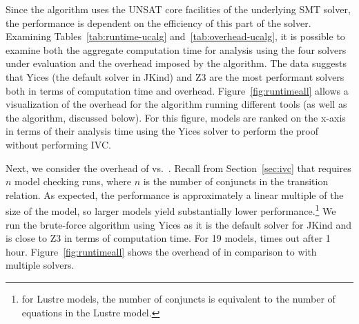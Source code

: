 Since the \ucalg algorithm uses the UNSAT core facilities of the
underlying SMT solver, the performance is dependent on the efficiency
of this part of the solver. Examining Tables~\ref{tab:runtime-ucalg}
and~\ref{tab:overhead-ucalg}, it is possible to examine both the
aggregate computation time for analysis using the four solvers under
evaluation and the overhead imposed by the \ucalg algorithm. The data
suggests that Yices (the default solver in JKind) and Z3 are the most
performant solvers both in terms of computation time and overhead.
Figure~\ref{fig:runtimeall} allows a visualization of the overhead for
the \ucalg algorithm running different tools (as well as the \bfalg
algorithm, discussed below). For this figure, models are ranked on the
x-axis in terms of their analysis time using the Yices solver to perform
the proof without performing IVC.






Next, we consider the overhead of \ucalg vs.\ \bfalg.  Recall from Section~\ref{sec:ivc} that \bfalg requires $n$ model checking runs, where $n$ is the number of conjuncts in the transition relation. As expected, the performance is approximately a linear multiple of the size of the model, so larger models yield substantially lower performance.\footnote{for Lustre models, the number of conjuncts is equivalent to the number of equations in the Lustre model.}  We run the brute-force algorithm using Yices as it is the default solver for JKind and is close to Z3 in terms of computation time.  For 19 models, \bfalg times out after 1 hour.   Figure~\ref{fig:runtimeall} shows the overhead of \bfalg in comparison to \ucalg with multiple solvers.

